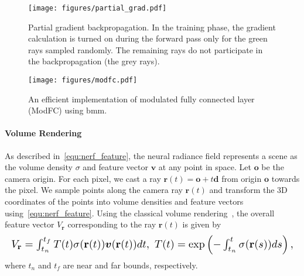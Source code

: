 \documentclass[10pt,twocolumn,letterpaper]{article}
\def\vd{{\bm{d}}}
\def\vo{{\bm{o}}}
\def\vv{{\bm{v}}}
\begin{document}
\begin{figure*}[!t]
  \centering
  \begin{minipage}[t]{0.68\linewidth}
    \begin{center}
\texttt{[image: figures/partial\_grad.pdf]}
    \end{center}
    \vspace{-0.6cm}
    \caption{Partial gradient backpropagation. In the training phase, the gradient calculation is turned on during the forward pass only for the green rays sampled randomly. The remaining rays do not participate in the backpropagation (the grey rays).}
    \vspace{-0.4cm}
    \label{fig:partial_grad}
  \end{minipage}\hspace{0.002\linewidth}
  \vline
  \hspace{0.005\linewidth}
  \centering
  \begin{minipage}[t]{0.3\linewidth}
    \centering
    \texttt{[image: figures/modfc.pdf]}
    \vspace{-0.7cm}
    \caption{An efficient implementation of modulated fully connected layer (ModFC) using $\mathrm{bmm}$.}
    \vspace{-1cm}
    \label{fig:modfc}
  \end{minipage}
\end{figure*}



\paragraph{Volume Rendering}
As described in~\cref{equ:nerf_feature}, the neural radiance field represents a scene as the volume density $\sigma$ and feature vector $\vv$ at any point in space. Let $\vo$ be the camera origin. For each pixel, we cast a ray $\mathbf{r}(t)=\vo+t \vd$ from origin $\vo$ towards the pixel. We sample points along the camera ray $\mathbf{r}(t)$ and transform the 3D coordinates of the points into volume densities and feature vectors using~\cref{equ:nerf_feature}. Using the classical volume rendering~\cite{kajiya1984Ray}, the overall feature vector $V_\mathbf{r}$ corresponding to the ray $\mathbf{r}(t)$ is given by
\begin{equation}
\resizebox{\hsize}{!}{$
      V_\mathbf{r}  =\int_{t_{n}}^{t_{f}} T(t) \sigma(\mathbf{r}(t)) \vv(\mathbf{r}(t) ) dt, \ T(t)          =\exp \left(-\int_{t_{n}}^{t} \sigma(\mathbf{r}(s)) d s\right),
    $}
\label{equ:volume_render}
\end{equation}
where $t_n$ and $t_f$ are near and far bounds, respectively.
\end{document}
